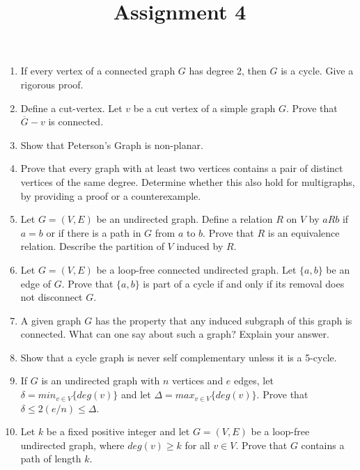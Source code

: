 \documentclass[a4paper]{article}
\title{Assignment 4}
\begin{document}
\maketitle
\begin{enumerate}



\item If every vertex of a connected graph $G$ has degree 2, then $G$ is a cycle. Give a rigorous proof.  

\item Define a cut-vertex. Let $v$ be a cut vertex of a simple graph $G$. Prove that $\overline{G}-v$  is connected. 


\item Show that Peterson's Graph is non-planar.

\item Prove that every graph with at least two vertices contains a pair of distinct 
vertices of the same degree. Determine whether this also hold for multigraphs, by
providing a proof or a counterexample.

\item Let $G=(V,E)$ be an undirected graph. Define a relation $R$ on $V$ by $aRb$ if $a=b$ or if there is a path in $G$ from $a$ to $b$. Prove that $R$ is an equivalence relation. Describe the partition of $V$ induced by $R$.


\item Let $G=(V,E)$ be a loop-free connected undirected graph. Let $\{a,b\}$ be an edge of $G$. Prove that $\{a,b\}$ is part of a cycle if and only if its removal does not disconnect $G$.



\item A given graph $G$ has the property that any induced subgraph of this graph is connected. What can one say about such a graph? Explain your answer.

\item Show that a cycle graph is never self complementary unless it is a 5-cycle.

\item If $G$ is an undirected graph with $n$ vertices and $e$ edges, let $\delta = min_{v\in V}\{deg(v)\}$ and let $\Delta=max_{v\in V}\{deg(v)\}$. Prove that $\delta\leq 2(e/n)\leq \Delta$.

\item Let $k$ be a fixed positive integer and let $G=(V,E)$ be a loop-free undirected graph, where $deg(v)\geq k$ for all $v\in V$. Prove that $G$ contains a path of length $k$.


\end{enumerate}
\end{document}
